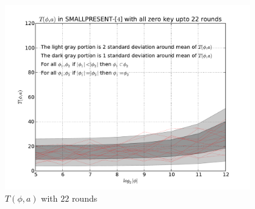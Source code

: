 \begin{figure}[h!]
    \centering
    \includegraphics[width=\textwidth , height = 8cm]{images/T_a_phi_variable_a_varible_phi_variable_size_22rounds}
    \caption{$T(\phi,a)$ with $22$ rounds}
    \label{fig:T_a_phi_variable_a_varible_phi_variable_size_22rounds}
\end{figure}

